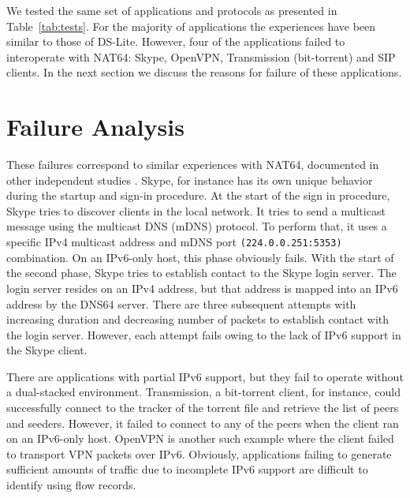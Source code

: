 \documentclass{llncs}
\begin{document}
We tested the same set of applications and protocols as presented in
Table~\ref{tab:tests}. For the majority of applications the experiences have been similar to those of DS-Lite. However, four of the applications failed to interoperate with NAT64: Skype, OpenVPN, Transmission (bit-torrent) and SIP clients. In the next section we discuss the reasons for failure of these applications.

\section{Failure Analysis}
\label{sec:failure-analysis}

These failures correspond to similar experiences with NAT64, documented in other independent studies \cite{ARKKO, UENO,   citeulike:9731000}. Skype, for instance has its own unique behavior during the startup and sign-in procedure. At the start of the sign in procedure, Skype tries to discover clients in the local network. It tries to send a multicast message using the multicast DNS (mDNS) protocol. To perform that, it uses a specific IPv4 multicast address and mDNS port \texttt{(224.0.0.251:5353)} combination. On an IPv6-only host, this phase obviously fails. With the start of the second phase, Skype tries to establish contact to the Skype login server. The login server resides on an IPv4 address, but that address is mapped into an IPv6 address by the DNS64 server. There are three subsequent attempts with increasing duration and decreasing number of packets to establish contact with the login server. However, each attempt fails owing to the lack of IPv6 support in the Skype client.

There are applications with partial IPv6 support, but they fail to operate without a dual-stacked environment. Transmission, a bit-torrent client, for instance, could successfully connect to the tracker of the torrent file and retrieve the list of peers and seeders. However, it failed to connect to any of the peers when the client ran on an IPv6-only host. OpenVPN is another such example where the client failed to transport VPN packets over IPv6. Obviously, applications failing to generate sufficient amounts of traffic due to incomplete IPv6 support are difficult to identify using flow records.
\end{document}
